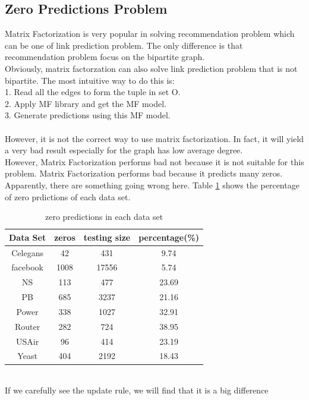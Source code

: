 \documentclass[12pt]{article}
\begin{document}
\subsection{Zero Predictions Problem}
Matrix Factorization is very popular in solving recommendation problem which can be one of link prediction problem. The only difference is that recommendation problem focus on the bipartite graph. 
\\
Obviously, matrix factorzation can also solve link prediction problem that is not bipartite. The most intuitive way to do this is: 
\\
1. Read all the edges to form the tuple in set O.
\\
2. Apply MF library and get the MF model.
\\
3. Generate predictions using this MF model.
\\
\\
However, it is not the correct way to use matrix factorization. In fact, it will yield a very bad result especially for the graph has low average degree. 
\\
However, Matrix Factorization performs bad not because it is not suitable for this problem. Matrix Factorization performs bad because it predicts many zeros. Apparently, there are something going wrong here. Table \ref{tab:zero} shows the percentage of zero prdictions of each data set. 
\\
\begin{table}
	\begin{center}
		\begin{tabular}{|c|c|c|c|}
			\hline
			Data Set & zeros & testing size & percentage(\%) \\
			\hline
			Celegans&42&431&9.74 \\
			facebook&1008&17556&5.74 \\
			NS&113&477&23.69 \\
			PB&685&3237&21.16 \\
			Power&338&1027&32.91 \\
			Router&282&724&38.95 \\
			USAir&96&414&23.19 \\
			Yeast&404&2192&18.43 \\
			\hline
		\end{tabular}
	\end{center}
	\caption{zero predictions in each data set}
	\label{tab:zero}
\end{table}
\\
If we carefully see the update rule, we will find that it is a big difference 
\end{document}
